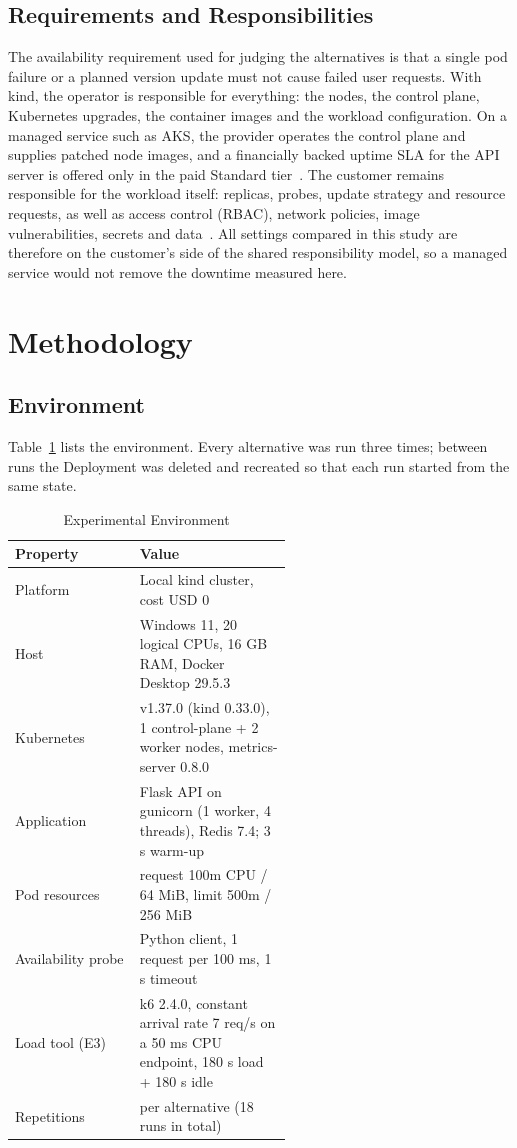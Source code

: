 \documentclass[conference,a4paper]{IEEEtran}
\begin{document}
\subsection{Requirements and Responsibilities}
The availability requirement used for judging the alternatives is that a single pod failure or a planned version update must not cause failed user requests. With kind, the operator is responsible for everything: the nodes, the control plane, Kubernetes upgrades, the container images and the workload configuration. On a managed service such as AKS, the provider operates the control plane and supplies patched node images, and a financially backed uptime SLA for the API server is offered only in the paid Standard tier~\cite{aksTiers}. The customer remains responsible for the workload itself: replicas, probes, update strategy and resource requests, as well as access control (RBAC), network policies, image vulnerabilities, secrets and data~\cite{azshared}. All settings compared in this study are therefore on the customer's side of the shared responsibility model, so a managed service would not remove the downtime measured here.

\section{Methodology}
\label{sec:methodology}

\subsection{Environment}
Table~\ref{tab:environment} lists the environment. Every alternative was run three times; between runs the Deployment was deleted and recreated so that each run started from the same state.

\begin{table}[htbp]
	\caption{Experimental Environment}
	\label{tab:environment}
	\centering
	\footnotesize
	\begin{tabular}{|l|>{\raggedright\arraybackslash}p{0.55\linewidth}|}
		\hline
		\textbf{Property} & \textbf{Value} \\
		\hline
		Platform & Local kind cluster, cost USD 0 \\
		\hline
		Host & Windows 11, 20 logical CPUs, 16 GB RAM, Docker Desktop 29.5.3 \\
		\hline
		Kubernetes & v1.37.0 (kind 0.33.0), 1 control-plane + 2 worker nodes, metrics-server 0.8.0 \\
		\hline
		Application & Flask API on gunicorn (1 worker, 4 threads), Redis 7.4; 3 s warm-up \\
		\hline
		Pod resources & request 100m CPU / 64 MiB, limit 500m / 256 MiB \\
		\hline
		Availability probe & Python client, 1 request per 100 ms, 1 s timeout \\
		\hline
		Load tool (E3) & k6 2.4.0, constant arrival rate 7 req/s on a 50 ms CPU endpoint, 180 s load + 180 s idle \\
		\hline
		Repetitions & 3 per alternative (18 runs in total) \\
		\hline
	\end{tabular}
\end{table}
\end{document}
